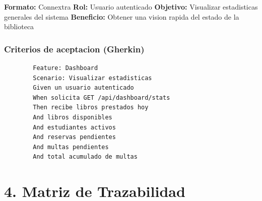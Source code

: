 \documentclass[
11pt,
a4paper,
]{report}
\begin{document}
	\textbf{Formato:} Connextra
	\textbf{Rol:} Usuario autenticado
	\textbf{Objetivo:} Visualizar estadisticas generales del sistema
	\textbf{Beneficio:} Obtener una vision rapida del estado de la biblioteca
	
	\hypertarget{criterios-de-aceptacion-gherkin-4}{%
		\subsection{Criterios de aceptacion (Gherkin)}\label{criterios-de-aceptacion-gherkin-4}}
	
	\begin{lstlisting}
		Feature: Dashboard
		Scenario: Visualizar estadisticas
		Given un usuario autenticado
		When solicita GET /api/dashboard/stats
		Then recibe libros prestados hoy
		And libros disponibles
		And estudiantes activos
		And reservas pendientes
		And multas pendientes
		And total acumulado de multas
	\end{lstlisting}
	
	\hypertarget{matriz-de-trazabilidad}{%
		\chapter{4. Matriz de Trazabilidad}\label{matriz-de-trazabilidad}}
	
\end{document}

